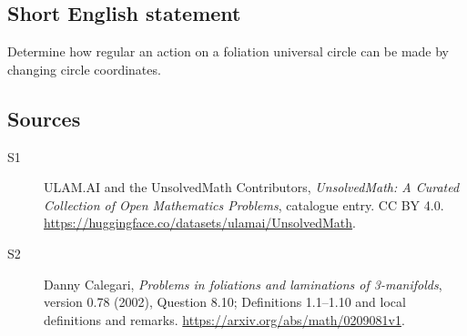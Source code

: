 \documentclass[11pt]{article}
\begin{document}
\subsection{Short English statement}
Determine how regular an action on a foliation universal circle can be made by changing circle coordinates.
\subsection{Sources}
\begin{description}
\item[\hypertarget{source:statement:1}{S1}] ULAM.AI and the UnsolvedMath Contributors, \emph{UnsolvedMath: A Curated Collection of Open Mathematics Problems}, catalogue entry. CC BY 4.0. \url{https://huggingface.co/datasets/ulamai/UnsolvedMath}.
\item[\hypertarget{source:statement:2}{S2}] Danny Calegari, \emph{Problems in foliations and laminations of 3-manifolds}, version 0.78 (2002), Question 8.10; Definitions 1.1--1.10 and local definitions and remarks. \url{https://arxiv.org/abs/math/0209081v1}.
\end{description}
\label{end:statement}
\end{document}

